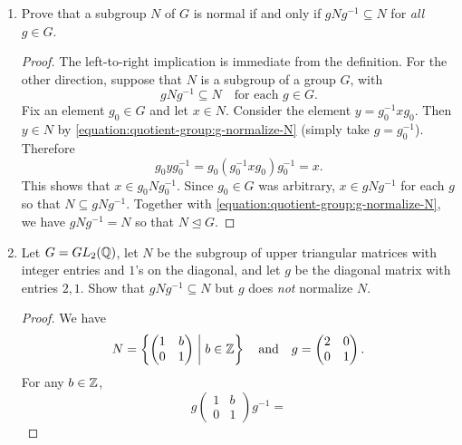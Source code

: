 \label{exercise:quotient-group:normal-criterion}
\begin{enumerate}
\item Prove that a subgroup $N$ of $G$ is normal if and only if
  $gNg^{-1}\subseteq N$ for {\em all} $g\in G$.
  \begin{proof}
    The left-to-right implication is immediate from the
    definition. For the other direction, suppose that $N$ is a
    subgroup of a group $G$, with
    \begin{equation}
      \label{equation:quotient-group:g-normalize-N}
      gNg^{-1}\subseteq N
      \quad\text{for each $g\in G$}.
    \end{equation}
    Fix an element $g_0\in G$ and let $x\in N$. Consider the element
    $y = g_0^{-1}xg_0$. Then $y\in N$ by
    \eqref{equation:quotient-group:g-normalize-N} (simply take
    $g = g_0^{-1}$). Therefore
    \begin{equation*}
      g_0yg_0^{-1} = g_0(g_0^{-1}xg_0)g_0^{-1} = x.
    \end{equation*}
    This shows that $x\in g_0Ng_0^{-1}$. Since $g_0\in G$ was
    arbitrary, $x\in gNg^{-1}$ for each $g$ so that
    $N\subseteq gNg^{-1}$. Together with
    \eqref{equation:quotient-group:g-normalize-N}, we have
    $gNg^{-1} = N$ so that $N\trianglelefteq G$.
  \end{proof}
\item Let $G = GL_2(\mathbb{Q})$, let $N$ be the subgroup of upper triangular
  matrices with integer entries and $1$'s on the diagonal, and let $g$
  be the diagonal matrix with entries $2,1$. Show that
  $gNg^{-1}\subseteq N$ but $g$ does {\em not} normalize $N$.
  \begin{proof}
    We have
    \begin{equation*}
      N = \left\{
        \begin{pmatrix}
          1 & b \\
          0 & 1
        \end{pmatrix}
        \;\middle|\;
        b\in\mathbb{Z}
      \right\}
      \quad\text{and}\quad
      g =
      \begin{pmatrix}
        2 & 0 \\
        0 & 1
      \end{pmatrix}.
    \end{equation*}
    For any $b\in\mathbb{Z}$,
    \begin{equation*}
      g\begin{pmatrix} 1 & b \\ 0 & 1 \end{pmatrix}g^{-1} =

\end{equation*}
\end{proof}
\end{enumerate}
